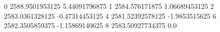 0 2588.9501953125 5.44091796875
1 2584.576171875 1.06689453125
2 2583.0361328125 -0.47314453125
4 2581.52392578125 -1.9853515625
6 2582.3505859375 -1.15869140625
8 2583.50927734375 0.0
